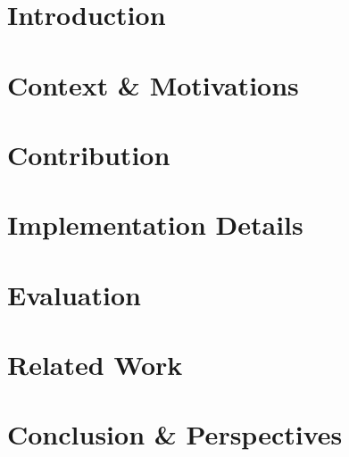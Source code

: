 	\newpage
	
	\tableofcontents
	
	\newpage
	
	\section{Introduction}
	\label{sec:intoduction}
	
	
	\section{Context \& Motivations}
	\label{sec:context_motivation}
	
	
	\section{Contribution}
	\label{sec:contribution}
	
	
	\section{Implementation Details}
	\label{sec:implementation_details}
	
	
	\section{Evaluation}
	\label{sec:evaluation}
	
	
	\section{Related Work}
	\label{sec:related_work}
	
	
	\section{Conclusion \& Perspectives}
	\label{sec:conclusion_perspectives}
	
	
	
	

